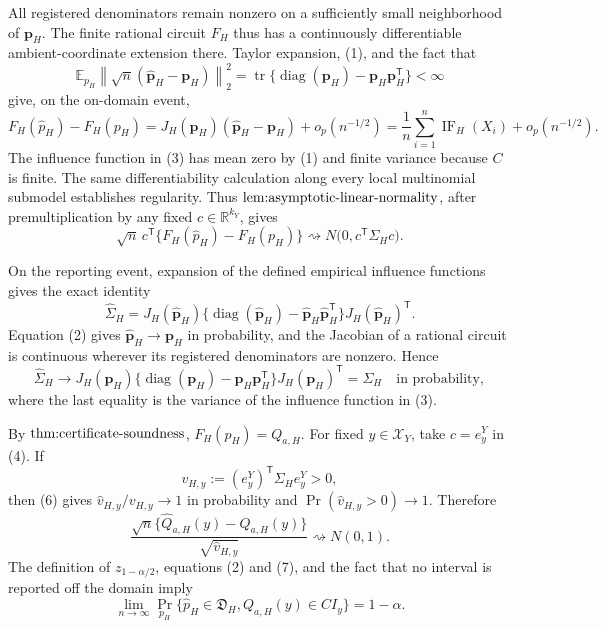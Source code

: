 All registered denominators remain nonzero on a sufficiently small neighborhood of \(\mathbf p_H\).  The finite rational circuit \(F_H\) thus has a continuously differentiable ambient-coordinate extension there.  Taylor expansion, (1), and the fact that
\[
 \mathbb E_{p_H}\left\|\sqrt n
 (\widehat{\mathbf p}_H-\mathbf p_H)\right\|_2^2
 =\operatorname{tr}\{\operatorname{diag}(\mathbf p_H)
 -\mathbf p_H\mathbf p_H^{\mathsf T}\}<\infty
\]
give, on the on-domain event,
\[
 F_H(\widehat p_H)-F_H(p_H)
 =J_H(\mathbf p_H)(\widehat{\mathbf p}_H-\mathbf p_H)
 +o_p(n^{-1/2})
 =\frac1n\sum_{i=1}^n\operatorname{IF}_H(X_i)+o_p(n^{-1/2}).
\tag{3}
\]
The influence function in (3) has mean zero by (1) and finite variance because \(C\) is finite.  The same differentiability calculation along every local multinomial submodel establishes regularity.  Thus \(\textnormal{lem:asymptotic-linear-normality}\), after premultiplication by any fixed \(c\in\mathbb R^{k_Y}\), gives
\[
 \sqrt n\,c^{\mathsf T}
 \{F_H(\widehat p_H)-F_H(p_H)\}
 \rightsquigarrow
 N\bigl(0,c^{\mathsf T}\Sigma_Hc\bigr).
\tag{4}
\]

On the reporting event, expansion of the defined empirical influence functions gives the exact identity
\[
 \widehat\Sigma_H
 =J_H(\widehat{\mathbf p}_H)
 \{\operatorname{diag}(\widehat{\mathbf p}_H)
 -\widehat{\mathbf p}_H\widehat{\mathbf p}_H^{\mathsf T}\}
 J_H(\widehat{\mathbf p}_H)^{\mathsf T}.
\tag{5}
\]
Equation (2) gives \(\widehat{\mathbf p}_H\to\mathbf p_H\) in probability, and the Jacobian of a rational circuit is continuous wherever its registered denominators are nonzero.  Hence
\[
 \widehat\Sigma_H\longrightarrow
 J_H(\mathbf p_H)
 \{\operatorname{diag}(\mathbf p_H)-\mathbf p_H\mathbf p_H^{\mathsf T}\}
 J_H(\mathbf p_H)^{\mathsf T}
 =\Sigma_H
 \quad\text{in probability},
\tag{6}
\]
where the last equality is the variance of the influence function in (3).

By \(\textnormal{thm:certificate-soundness}\), \(F_H(p_H)=Q_{a,H}\).  For fixed \(y\in\mathcal X_Y\), take \(c=e_y^Y\) in (4).  If
\[
 v_{H,y}:=(e_y^Y)^{\mathsf T}\Sigma_H e_y^Y>0,
\]
then (6) gives \(\widehat v_{H,y}/v_{H,y}\to1\) in probability and \(\Pr(\widehat v_{H,y}>0)\to1\).  Therefore
\[
 \frac{\sqrt n\{\widehat Q_{a,H}(y)-Q_{a,H}(y)\}}
 {\sqrt{\widehat v_{H,y}}}
 \rightsquigarrow N(0,1).
\tag{7}
\]
The definition of \(z_{1-\alpha/2}\), equations (2) and (7), and the fact that no interval is reported off the domain imply
\[
 \lim_{n\to\infty}
 \Pr_{p_H}\{\widehat p_H\in\mathfrak D_H,
 Q_{a,H}(y)\in CI_y\}=1-\alpha.
\tag{8}
\]

